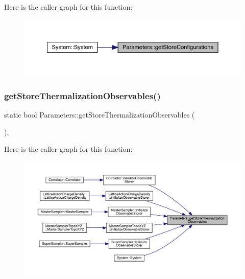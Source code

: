 Here is the caller graph for this function\+:
\nopagebreak
\begin{figure}[H]
\begin{center}
\leavevmode
\includegraphics[width=350pt]{class_parameters_a38f06b562355b56a1b1222e1cfe6735a_icgraph}
\end{center}
\end{figure}
\mbox{\label{class_parameters_a216f85b3c5980a33f8a54c42fb3575c7}} 
\subsubsection{\texorpdfstring{getStoreThermalizationObservables()}{getStoreThermalizationObservables()}}
{\footnotesize\ttfamily static bool Parameters\+::get\+Store\+Thermalization\+Observables (\begin{DoxyParamCaption}{ }\end{DoxyParamCaption})\hspace{0.3cm}{\ttfamily [inline]}, {\ttfamily [static]}}

Here is the caller graph for this function\+:
\nopagebreak
\begin{figure}[H]
\begin{center}
\leavevmode
\includegraphics[width=350pt]{class_parameters_a216f85b3c5980a33f8a54c42fb3575c7_icgraph}
\end{center}
\end{figure}
\mbox{\label{class_parameters_ac14d1b11099fdfa254fb138d4471ceb2}} 
